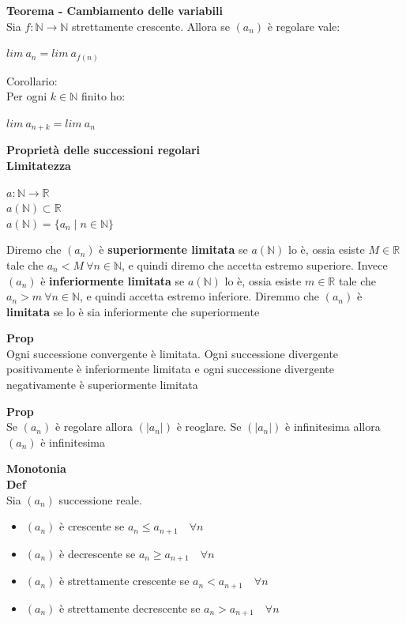 \documentclass[12pt, a4paper]{article}
\begin{document}
    \textbf{Teorema - Cambiamento delle variabili}\\Sia $f:\mathbb{N}\to\mathbb{N}$ strettamente crescente. Allora se
$(a_{n})$ è regolare vale:
    \begin{center}
        $lim\ a_{n}=lim\ a_{f(n)}$
    \end{center}

    Corollario:\\Per ogni $k\in\mathbb{N}$ finito ho:
    \begin{center}
        $lim\ a_{n+k}=lim\ a_{n}$
    \end{center}

    \textbf{Proprietà delle successioni regolari\\Limitatezza}
    \begin{center}
        $a:\mathbb{N}\to\mathbb{R}$\\
        $a(\mathbb{N})\subset\mathbb{R}$\\
        $a(\mathbb{N})=\{a_{n}\mid n\in\mathbb{N}\}$
    \end{center}
    Diremo che $(a_{n})$ è \textbf{superiormente limitata} se $a(\mathbb{N})$ lo è, ossia esiste $M\in\mathbb{R}$ tale che
$a_{n}<M\ \forall n\in\mathbb{N}$, e quindi diremo che accetta estremo superiore. Invece $(a_{n})$ è
    \textbf{inferiormente limitata} se $a(\mathbb{N})$ lo è, ossia esiste $m\in\mathbb{R}$ tale che $a_{n}>m\ \forall
n\in\mathbb{N}$, e quindi accetta estremo inferiore. Diremmo che $(a_{n})$ è \textbf{limitata} se lo è sia
    inferiormente che superiormente

    \textbf{Prop}\\Ogni successione convergente è limitata. Ogni successione divergente positivamente è inferiormente
    limitata e ogni successione divergente negativamente è superiormente limitata

    \textbf{Prop}\\Se $(a_{n})$ è regolare allora $(|a_{n}|)$ è reoglare. Se $(|a_{n}|)$ è infinitesima allora $(a_{n})$
    è infinitesima

    \textbf{Monotonia\\Def}\\Sia $(a_{n})$ successione reale.
    \begin{itemize}
        \item $(a_{n})$ è crescente se $a_{n}\leq a_{n+1}\quad\forall n$
        \item $(a_{n})$ è decrescente se $a_{n}\geq a_{n+1}\quad\forall n$
        \item $(a_{n})$ è strettamente crescente se $a_{n}< a_{n+1}\quad\forall n$
        \item $(a_{n})$ è strettamente decrescente se $a_{n}> a_{n+1}\quad\forall n$
    \end{itemize}
\end{document}
